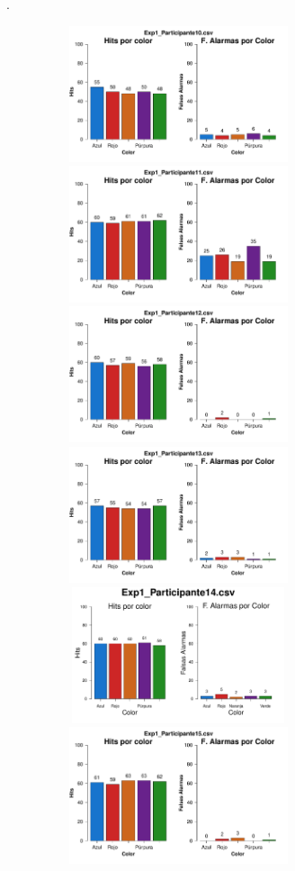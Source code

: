 \documentclass[a4paper ]{article}
\begin{document}
\vfill .
\begin{figure}[th]
\begin{center}
\includegraphics[width=8cm, height=4cm]{Figures/Color_Exp1_P10} \includegraphics[width=8cm, height=4cm]{Figures/Color_Exp1_P11} \includegraphics[width=8cm, height=4cm]{Figures/Color_Exp1_P12}
\includegraphics[width=8cm, height=4cm]{Figures/Color_Exp1_P13} \includegraphics[width=8cm, height=4cm]{Figures/Color_Exp1_P14} \includegraphics[width=8cm, height=4cm]{Figures/Color_Exp1_P15}

\end{center}
\end{figure}
\end{document}
